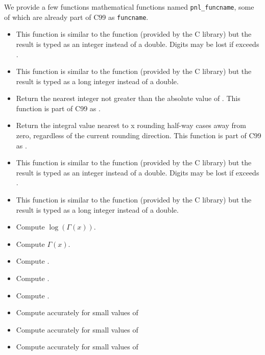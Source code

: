 We provide a few functions mathematical functions named \verb+pnl_funcname+,
some of which are already part of C99 as \verb+funcname+.
\begin{itemize}
  \item {}
    \sshortdescribe This function is similar to the  function
    (provided by the C library) but the result is typed as an integer instead of a
    double. Digits may be lost if  exceeds .
  \item {}
    \sshortdescribe This function is similar to the  function
    (provided by the C library) but the result is typed as a long integer instead of a
    double. 
  \item {}
    \sshortdescribe Return the nearest integer not greater than the absolute
    value of . This function is part of C99 as .
  \item {}
    \sshortdescribe Return the integral value nearest to x rounding
    half-way cases away from zero, regardless of the current rounding
    direction. This function is part of C99 as .
  \item {}
    \sshortdescribe This function is similar to the  function
    (provided by the C library) but the result is typed as an integer instead of a
    double. Digits may be lost if  exceeds .
  \item {}
    \sshortdescribe This function is similar to the  function
    (provided by the C library) but the result is typed as a long integer instead of a
    double. 
  \item {}
    \sshortdescribe Compute $\log(\Gamma(x))$.
  \item {}
    \sshortdescribe Compute $\Gamma(x)$.
  \item {}
    \sshortdescribe Compute .
  \item {}
    \sshortdescribe Compute .
  \item {}
    \sshortdescribe Compute .
  \item {}
    \sshortdescribe Compute  accurately for small values of 
  \item {}
    \sshortdescribe Compute  accurately for small values of 
  \item {}
    \sshortdescribe Compute  accurately for small values of 
\end{itemize}

